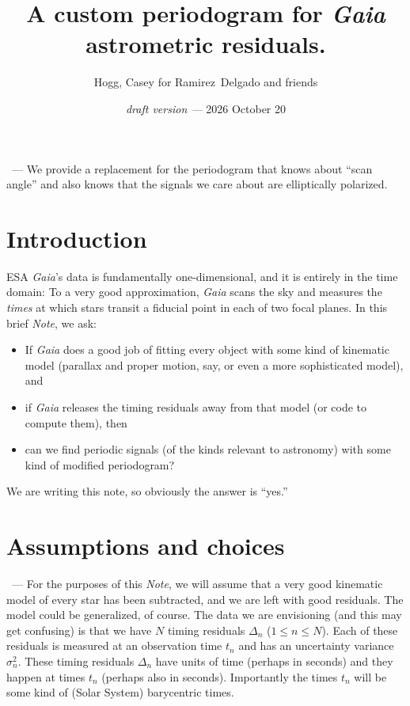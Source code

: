 \documentclass{article}
\title{\bfseries A custom periodogram for \textsl{Gaia} astrometric residuals.}
\author{Hogg, Casey for Ramirez~Delgado and friends}
\date{\textit{draft version ---} 2026 October 20}
\renewcommand{\paragraph}[1]{\medskip\par\noindent{\textbf{#1}}~---}
\newcommand{\documentname}{\textsl{Note}}
\begin{document}
\maketitle

\paragraph{Abstract}
We provide a replacement for the periodogram that knows about ``scan angle'' and also knows that the signals we care about are elliptically polarized.

\section{Introduction}\label{sec:intro}
ESA \textsl{Gaia}'s data is fundamentally one-dimensional, and it is entirely in the time domain:
To a very good approximation, \textsl{Gaia} scans the sky and measures the \emph{times} at which stars transit a fiducial point in each of two focal planes.
In this brief \documentname, we ask:
\begin{itemize}
    \item If \textsl{Gaia} does a good job of fitting every object with some kind of kinematic model (parallax and proper motion, say, or even a more sophisticated model), and
    \item if \textsl{Gaia} releases the timing residuals away from that model (or code to compute them), then
    \item can we find periodic signals (of the kinds relevant to astronomy) with some kind of modified periodogram?
\end{itemize}
We are writing this note, so obviously the answer is ``yes.''

\section{Assumptions and choices}\label{sec:assumptions}
\paragraph{Residual data}
For the purposes of this \documentname, we will assume that a very good kinematic model of every star has been subtracted, and we are left with good residuals.
The model could be generalized, of course.
The data we are envisioning (and this may get confusing) is that we have $N$ timing residuals $\Delta_n$ ($1\leq n\leq N$).
Each of these residuals is measured at an observation time $t_n$ and has an uncertainty variance $\sigma^2_n$.
These timing residuals $\Delta_n$ have units of time (perhaps in seconds) and they happen at times $t_n$ (perhaps also in seconds).
Importantly the times $t_n$ will be some kind of (Solar System) barycentric times.
\end{document}
